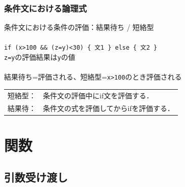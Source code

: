 \documentclass[dvipdfmx]{beamer}
\begin{document}
\begin{frame}[fragile]
 \frametitle{条件文における論理式}
 条件文における条件の評価：結果待ち / 短絡型\\
 \\
 \texttt{if (x>100 \&\& (z=y)<30) \{ 文1 \} else \{ 文2 \}}\\
 \texttt{z=y}の評価結果は\texttt{y}の値\\
 \\
 結果待ち=評価される、短絡型=\texttt{x>100}のとき評価される\\

\begin{tabular}{ll}
短絡型：& 条件文の評価中にif文を評価する．\\
結果待：& 条件文の式を評価してからifを評価する．
\end{tabular}



\end{frame}

\section{関数}

\subsection{引数受け渡し}
\end{document}
